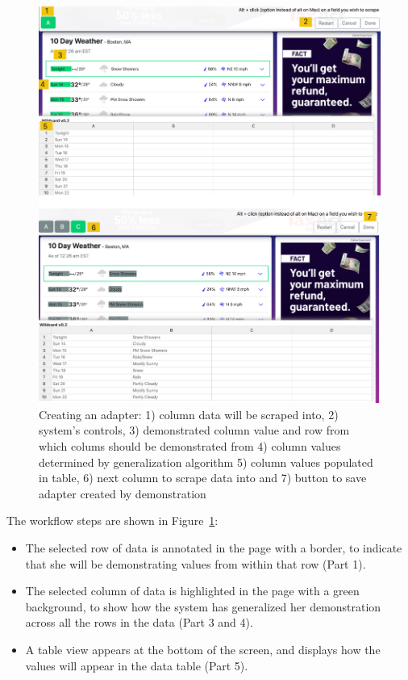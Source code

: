 \documentclass[sigconf,10pt]{acmart}
\providecommand{\tightlist}{%
  \setlength{\itemsep}{0pt}\setlength{\parskip}{0pt}}
\begin{document}
\begin{figure}
  \includegraphics[width=\textwidth]{media/creating.png}
  \caption{\label{fig:creating} Creating an adapter: 1) column data will be scraped into, 2) system's controls, 3) demonstrated column value and row from which colums should be demonstrated from 4) column values determined by generalization algorithm 5) column values populated in table, 6) next column to scrape data into and 7) button to save adapter created by demonstration}
\end{figure}

The workflow steps are shown in Figure~\ref{fig:creating}:

\begin{itemize}
\tightlist
\item
  The selected row of data is annotated in the page with a border, to
  indicate that she will be demonstrating values from within that row
  (Part 1).
\item
  The selected column of data is highlighted in the page with a green
  background, to show how the system has generalized her demonstration
  across all the rows in the data (Part 3 and 4).
\item
  A table view appears at the bottom of the screen, and displays how the
  values will appear in the data table (Part 5).
\end{itemize}
\end{document}
